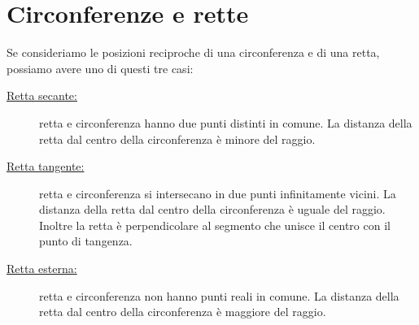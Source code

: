 \section{Circonferenze e rette}
\label{sec:circ_circrette}

Se consideriamo le posizioni reciproche di una circonferenza e di una retta, 
possiamo avere uno di questi tre casi:

\begin{description} %
 \item [\underline{Retta secante:}] retta e circonferenza hanno due punti distinti in comune. La distanza della retta
 dal centro della circonferenza è minore del raggio.
 \item [\underline{Retta tangente:}]
retta e circonferenza si intersecano in due punti infinitamente vicini. 
La distanza della retta dal centro della circonferenza è uguale del raggio. Inoltre la retta è
perpendicolare al segmento che unisce il centro con il punto di tangenza.
 \item [\underline{Retta esterna:}]
retta e circonferenza non hanno punti reali in comune. La distanza della retta
 dal centro della circonferenza è maggiore del raggio.
\end{description}

\begin{comment}
\noindent\begin{minipage}{.48\textwidth}
TODO
\end{minipage}
\hfill
\begin{minipage}{.48\textwidth}
\begin{center}
\begin{inaccessibleblock}[Circonferenza con una retta secante, una retta 
tangente e una retta esterna.]
\end{inaccessibleblock}
\end{center}
\end{minipage}
\end{comment}

